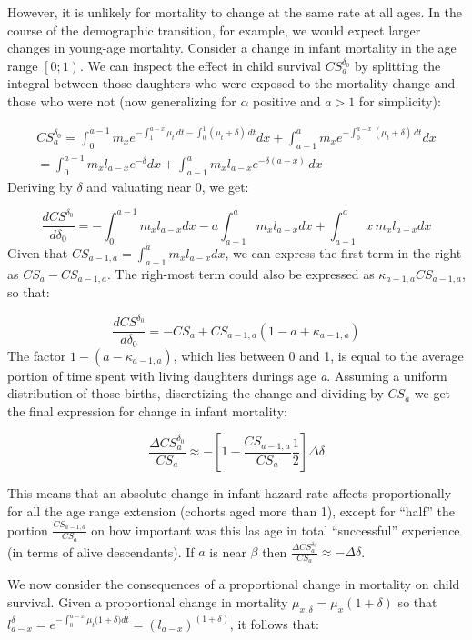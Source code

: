 \documentclass[
]{article}
\begin{document}
However, it is unlikely for mortality to change at the same rate at all
ages. In the course of the demographic transition, for example, we would
expect larger changes in young-age mortality. Consider a change in
infant mortality in the age range \(\left[0;1\right)\). We can inspect
the effect in child survival \(CS_{a}^{\delta_0}\) by splitting the
integral between those daughters who were exposed to the mortality
change and those who were not (now generalizing for \(\alpha\) positive
and \(a>1\) for simplicity):

\[
\begin{aligned}
CS_{a}^{\delta_0} = \int_{0}^{a-1} m_{x} {e{^{-\int_{1}^{a-x}\mu_t \,dt-\int_{0}^{1}(\mu_t + \delta)\,dt}}} dx + \int_{a-1}^{a} m_{x} e^{-\int_{0}^{a-x}(\mu_t+ \delta)\,dt}dx \\
=\int_{0}^{a-1} m_{x} l_{a-x}e^{-\delta} dx + \int_{a-1}^{a} m_{x} l_{a-x} e^{-\delta(a-x)}\,dx
\end{aligned}
\] Deriving by \(\delta\) and valuating near 0, we get:

\[\frac{dCS^{\delta_0}}{d\delta_0} =-\int_{0}^{a-1} m_{x} l_{a-x} dx - a \int_{a-1}^{a} {m_{x} l_{a-x} dx} + \int_{a-1}^{a} {x \, m_{x} l_{a-x} dx}\]
Given that \(CS_{a-1,a}=\int_{a-1}^{a} {m_{x} l_{a-x} dx}\), we can
express the first term in the right as \(CS_a - CS_{a-1,a}\). The
righ-most term could also be expressed as \(\kappa_{a-1,a} CS_{a-1,a}\),
so that:

\[ \frac{dCS^{\delta_0}}{d\delta_0} = - CS_a + CS_{a-1,a} (1-a+\kappa_{a-1,a})\]
The factor \(1-(a-\kappa_{a-1,a})\), which lies between 0 and 1, is
equal to the average portion of time spent with living daughters durings
age \emph{a}. Assuming a uniform distribution of those births,
discretizing the change and dividing by \(CS_a\) we get the final
expression for change in infant mortality:

\[\frac{\Delta CS_{a}^{\delta_0}}{CS_{a}} \approx - \left[1-\frac{CS_{a-1,a}}{CS_a}\frac{1}{2}\right] \Delta\delta\]

This means that an absolute change in infant hazard rate affects
proportionally for all the age range extension (cohorts aged more than
1), except for ``half'' the portion \(\frac{CS_{a-1,a}}{CS_a}\) on how
important was this las age in total ``successful'' experience (in terms
of alive descendants). If \(a\) is near \(\beta\) then
\(\frac{\Delta CS_{a}^{\delta_0}}{CS_{a}} \approx -\Delta\delta\).

We now consider the consequences of a proportional change in mortality
on child survival. Given a proportional change in mortality
\(\mu_{x,\delta}=\mu_{x}(1+\delta)\) so that
\(l_{a-x}^\delta = e^{-\int_{0}^{a-x}{\mu_t(1+\delta})dt}=(l_{a-x})^{(1+\delta)}\),
it follows that:
\end{document}
